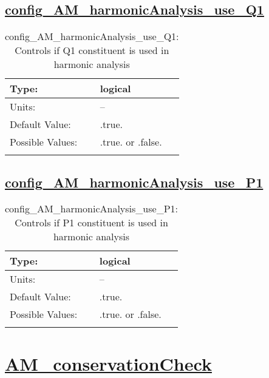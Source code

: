 \subsection[config\_AM\_harmonicAnalysis\_use\_Q1]{\hyperref[sec:nm_tab_AM_harmonicAnalysis]{config\_AM\_harmonicAnalysis\_use\_Q1}}
\label{subsec:nm_sec_config_AM_harmonicAnalysis_use_Q1}
\begin{center}
\begin{longtable}{| p{2.0in} || p{4.0in} |}
    \hline
    Type: & logical \\
    \hline
    Units: & -- \\
    \hline
    Default Value: & .true. \\
    \hline
    Possible Values: & .true. or .false. \\
    \hline
    \caption{config\_AM\_harmonicAnalysis\_use\_Q1: Controls if Q1 constituent is used in harmonic analysis}
\end{longtable}
\end{center}
\subsection[config\_AM\_harmonicAnalysis\_use\_P1]{\hyperref[sec:nm_tab_AM_harmonicAnalysis]{config\_AM\_harmonicAnalysis\_use\_P1}}
\label{subsec:nm_sec_config_AM_harmonicAnalysis_use_P1}
\begin{center}
\begin{longtable}{| p{2.0in} || p{4.0in} |}
    \hline
    Type: & logical \\
    \hline
    Units: & -- \\
    \hline
    Default Value: & .true. \\
    \hline
    Possible Values: & .true. or .false. \\
    \hline
    \caption{config\_AM\_harmonicAnalysis\_use\_P1: Controls if P1 constituent is used in harmonic analysis}
\end{longtable}
\end{center}
\section[AM\_conservationCheck]{\hyperref[sec:nm_tab_AM_conservationCheck]{AM\_conservationCheck}}
\label{sec:nm_sec_AM_conservationCheck}
